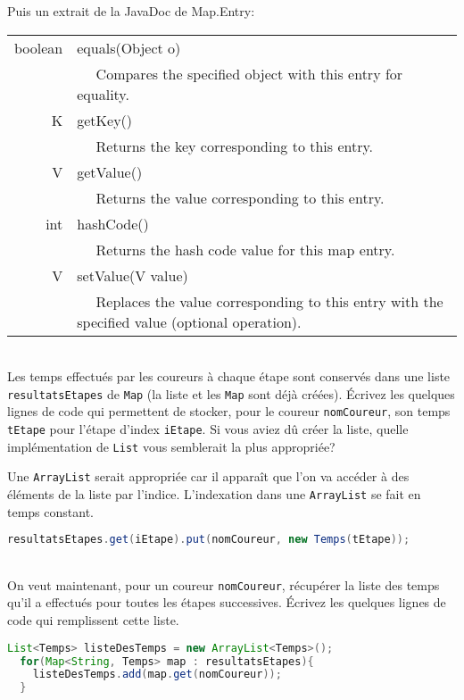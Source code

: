 \documentclass[iutinfo,a4paper,nocorrections,10pt]{ustl-tdtp}
\begin{document}
Puis un extrait de la JavaDoc de Map.Entry:

\begin{center}
\begin{tabular}{|r|l|}
\hline
 boolean&	equals(Object o) \\
          &~~ Compares the specified object with this entry for
          equality. \\
\hline
 K&	getKey() \\
     &  ~~   Returns the key corresponding to this entry. \\
\hline
 V&	getValue() \\
     &   ~~  Returns the value corresponding to this entry. \\
\hline
 int&	hashCode() \\
       &  ~~ Returns the hash code value for this map entry. \\
\hline
 V	&setValue(V value) \\
          &~~ Replaces the value corresponding to this entry with the specified value (optional operation). \\
\hline
\end{tabular}
\end{center}

~\\ \question Les temps effectués par les coureurs à
chaque étape sont conservés dans une liste \texttt{resultatsEtapes}
de \texttt{Map} (la liste et les \texttt{Map} sont déjà
créées). Écrivez les quelques lignes de code qui permettent de stocker,
pour le coureur \texttt{nomCoureur}, son temps \texttt{tEtape} pour
l'étape d'index \texttt{iEtape}. Si vous aviez dû créer la liste, quelle implémentation de \texttt{List} vous semblerait la plus appropriée?

\begin{correction}
{\color{red}
Une \texttt{ArrayList} serait appropriée car il apparaît que l'on va accéder à des éléments de la liste par l'indice. L'indexation dans une \texttt{ArrayList} se fait en temps constant.
\begin{lstlisting}[language=Java]
resultatsEtapes.get(iEtape).put(nomCoureur, new Temps(tEtape));
\end{lstlisting}
}
\end{correction}


~\\ \question  On veut maintenant, pour un coureur
\texttt{nomCoureur}, récupérer la liste des temps qu'il a effectués pour toutes les étapes successives. Écrivez les quelques lignes de code qui remplissent cette liste.
\begin{correction}
{\color{red}
\begin{lstlisting}[language=Java]
List<Temps> listeDesTemps = new ArrayList<Temps>();
  for(Map<String, Temps> map : resultatsEtapes){
    listeDesTemps.add(map.get(nomCoureur));
  }
\end{lstlisting}
}
\end{correction}
\end{document}
